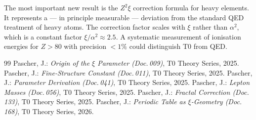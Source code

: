 The most important new result is the $Z^2\xi$ correction formula for heavy
elements. It represents a — in principle measurable — deviation from the
standard QED treatment of heavy atoms. The correction factor scales with $\xi$
rather than $\alpha^2$, which is a constant factor $\xi/\alpha^2 \approx 2.5$.
A systematic measurement of ionisation energies for $Z > 80$ with precision
$<1\%$ could distinguish T0 from QED.

\begin{thebibliography}{99}
 Pascher, J.: \emph{Origin of the $\xi$ Parameter (Doc.\,009)},
  T0 Theory Series, 2025.
 Pascher, J.: \emph{Fine-Structure Constant (Doc.\,011)},
  T0 Theory Series, 2025.
 Pascher, J.: \emph{Parameter Derivation (Doc.\,041)},
  T0 Theory Series, 2025.
 Pascher, J.: \emph{Lepton Masses (Doc.\,056)},
  T0 Theory Series, 2025.
 Pascher, J.: \emph{Fractal Correction (Doc.\,133)},
  T0 Theory Series, 2025.
 Pascher, J.: \emph{Periodic Table as $\xi$-Geometry (Doc.\,168)},
  T0 Theory Series, 2026.
\end{thebibliography}
